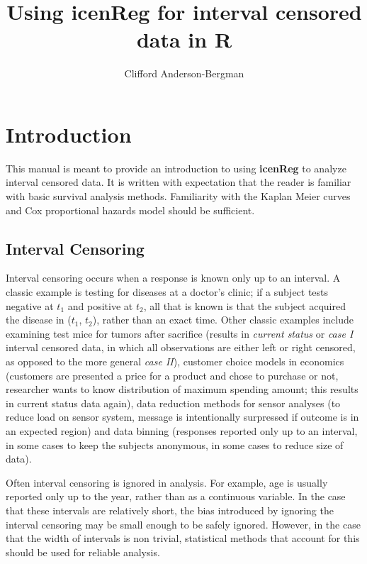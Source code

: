 \documentclass[11pt]{report}
\begin{document}


\title{Using {\bf{icenReg}} for interval censored data in {\bf{R} } }
\author{Clifford Anderson-Bergman}
\maketitle


\tableofcontents

\chapter{Introduction}

  This manual is meant to provide an introduction to using {\bf icenReg} to 
  analyze interval censored data. It is written with expectation that the reader
  is familiar with basic survival analysis methods. Familiarity with the Kaplan 
  Meier curves and Cox proportional hazards model should be sufficient. 

  \section{Interval Censoring}

  Interval censoring occurs when a response is known only up to an interval. 
  A classic example is testing for diseases at a doctor's clinic; if a 
  subject tests negative at $t_1$ and positive at $t_2$, all that is known is
  that the subject acquired the disease in ($t_1$, $t_2$), rather than an exact time. 
  Other classic examples include examining test mice for tumors after sacrifice 
  (results in \emph{current status} or \emph{case I} interval censored data, in which
  all observations are either left or right censored, as opposed to the more general
  \emph{case II}), customer choice models in economics (customers are presented a price
  for a product and chose to purchase or not, researcher wants to know distribution of 
  maximum spending amount; this results in current status data again), 
  data reduction methods for sensor analyses (to reduce load on sensor system, message
  is intentionally surpressed if outcome is in an expected region) and data binning 
  (responses reported only up to an interval, in some cases to keep the subjects
  anonymous, in some cases to reduce size of data). 

  
  Often interval censoring is ignored in analysis. For example, age is usually reported only 
  up to the year, rather than as a continuous variable. In the case that these intervals
  are relatively short, the bias introduced by ignoring the interval censoring may be 
  small enough to be safely ignored. However, in the case that the width of intervals is non
  trivial, statistical methods that account for this should be used for reliable analysis. 
  
\end{document}
